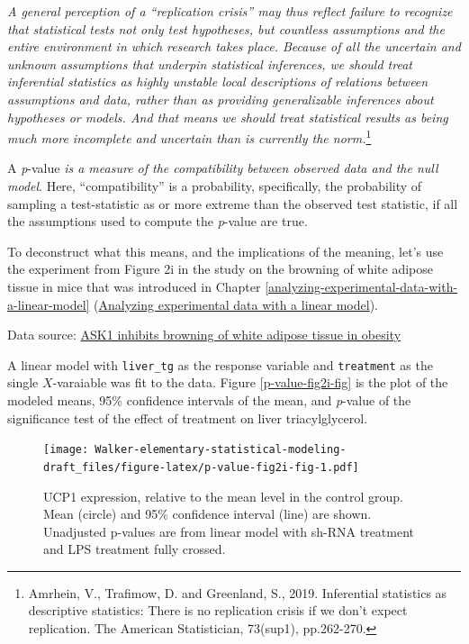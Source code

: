\documentclass[]{book}
\let\rmarkdownfootnote\footnote%
\def\footnote{\protect\rmarkdownfootnote}
\begin{document}
\emph{A general perception of a ``replication crisis'' may thus reflect failure to recognize that statistical tests not only test hypotheses, but countless assumptions and the entire environment in which research takes place. Because of all the uncertain and unknown assumptions that underpin statistical inferences, we should treat inferential statistics as highly unstable local descriptions of relations between assumptions and data, rather than as providing generalizable inferences about hypotheses or models. And that means we should treat statistical results as being much more incomplete and uncertain than is currently the norm.}\footnote{Amrhein, V., Trafimow, D. and Greenland, S., 2019. Inferential statistics as descriptive statistics: There is no replication crisis if we don't expect replication. The American Statistician, 73(sup1), pp.262-270.}

A \emph{p}-value \emph{is a measure of the compatibility between observed data and the null model}. Here, ``compatibility'' is a probability, specifically, the probability of sampling a test-statistic as or more extreme than the observed test statistic, if all the assumptions used to compute the \emph{p}-value are true.

To deconstruct what this means, and the implications of the meaning, let's use the experiment from Figure 2i in the study on the browning of white adipose tissue in mice that was introduced in Chapter \ref{analyzing-experimental-data-with-a-linear-model} (\protect\hyperlink{analyzing-experimental-data-with-a-linear-model}{Analyzing experimental data with a linear model}).

Data source: \href{https://www.nature.com/articles/s41467-020-15483-7}{ASK1 inhibits browning of white adipose tissue in obesity}

A linear model with \texttt{liver\_tg} as the response variable and \texttt{treatment} as the single \(X\)-varaiable was fit to the data. Figure \ref{p-value-fig2i-fig} is the plot of the modeled means, 95\% confidence intervals of the mean, and \emph{p}-value of the significance test of the effect of treatment on liver triacylglycerol.

\begin{figure}
\centering
\texttt{[image: Walker-elementary-statistical-modeling-draft\_files/figure-latex/p-value-fig2i-fig-1.pdf]}
\caption{\label{fig:p-value-fig2i-fig}UCP1 expression, relative to the mean level in the control group. Mean (circle) and 95\% confidence interval (line) are shown. Unadjusted p-values are from linear model with sh-RNA treatment and LPS treatment fully crossed.}
\end{figure}
\end{document}
